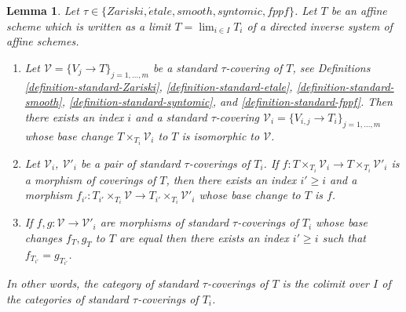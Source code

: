 \documentclass{stacks-project}
\theoremstyle{plain}
\newtheorem{lemma}[subsection]{Lemma}
\theoremstyle{definition}
\theoremstyle{remark}
\numberwithin{equation}{subsection}
\def\lim{\mathop{\mathrm{lim}}\nolimits}
\def\etale{{\acute{e}tale}}
\begin{document}
\begin{lemma}
\label{lemma-limit-fppf-topology}
Let $\tau \in \{Zariski, \etale, smooth, syntomic, fppf\}$.
Let $T$ be an affine scheme which is written as a limit
$T = \lim_{i \in I} T_i$ of a directed inverse system of affine schemes.
\begin{enumerate}
\item Let $\mathcal{V} = \{V_j \to T\}_{j = 1, \ldots, m}$ be a
standard $\tau$-covering of $T$, see Definitions
\ref{definition-standard-Zariski},
\ref{definition-standard-etale},
\ref{definition-standard-smooth},
\ref{definition-standard-syntomic}, and
\ref{definition-standard-fppf}.
Then there exists an index $i$ and a standard $\tau$-covering
$\mathcal{V}_i = \{V_{i, j} \to T_i\}_{j = 1, \ldots, m}$
whose base change $T \times_{T_i} \mathcal{V}_i$ to $T$
is isomorphic to $\mathcal{V}$.
\item Let $\mathcal{V}_i$, $\mathcal{V}'_i$ be a pair of standard
$\tau$-coverings of $T_i$. If
$f : T \times_{T_i} \mathcal{V}_i \to T \times_{T_i} \mathcal{V}'_i$ is
a morphism of coverings of $T$, then there exists an index
$i' \geq i$ and a morphism
$f_{i'} : T_{i'} \times_{T_i} \mathcal{V} \to
T_{i'} \times_{T_i} \mathcal{V}'_i$
whose base change to $T$ is $f$.
\item If
$f, g : \mathcal{V} \to \mathcal{V}'_i$
are morphisms of standard $\tau$-coverings of $T_i$ whose
base changes $f_T, g_T$ to $T$ are equal then there exists an
index $i' \geq i$ such that $f_{T_{i'}} = g_{T_{i'}}$.
\end{enumerate}
In other words, the category of standard $\tau$-coverings of $T$ is
the colimit over $I$ of the categories of standard $\tau$-coverings of $T_i$.
\end{lemma}
\end{document}
